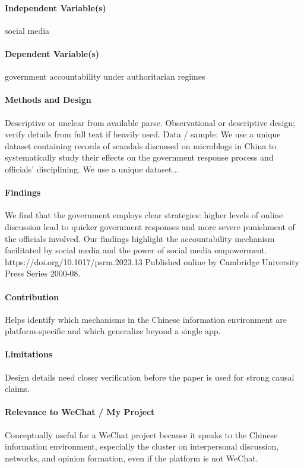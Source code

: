 \documentclass[12pt]{article}
\begin{document}
\paragraph{Independent Variable(s)} social media

\paragraph{Dependent Variable(s)} government accountability under authoritarian regimes

\paragraph{Methods and Design} Descriptive or unclear from available parse. Observational or descriptive design; verify details from full text if heavily used. Data / sample: We use a unique dataset containing records of scandals discussed on microblogs in China to systematically study their effects on the government response process and officials' disciplining. We use a unique dataset...

\paragraph{Findings} We find that the government employs clear strategies: higher levels of online discussion lead to quicker government responses and more severe punishment of the officials involved. Our findings highlight the accountability mechanism facilitated by social media and the power of social media empowerment. https://doi.org/10.1017/psrm.2023.13 Published online by Cambridge University Press Series 2000-08.

\paragraph{Contribution} Helps identify which mechanisms in the Chinese information environment are platform-specific and which generalize beyond a single app.

\paragraph{Limitations} Design details need closer verification before the paper is used for strong causal claims.

\paragraph{Relevance to WeChat / My Project} Conceptually useful for a WeChat project because it speaks to the Chinese information environment, especially the cluster on interpersonal discussion, networks, and opinion formation, even if the platform is not WeChat.
\end{document}
